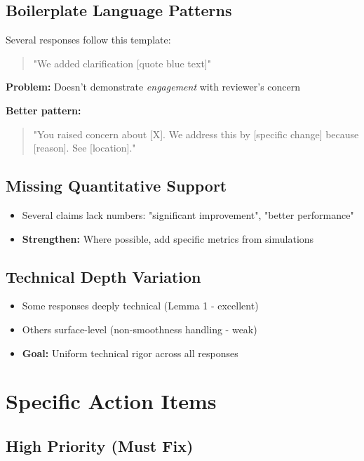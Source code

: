 \documentclass[11pt]{article}
\begin{document}
\subsection{Boilerplate Language Patterns}

Several responses follow this template:
\begin{quote}
"We added clarification [quote blue text]"
\end{quote}

\textbf{Problem:} Doesn't demonstrate \textit{engagement} with reviewer's concern

\textbf{Better pattern:}
\begin{quote}
"You raised concern about [X]. We address this by [specific change] because [reason]. See [location]."
\end{quote}

\subsection{Missing Quantitative Support}

\begin{itemize}
\item Several claims lack numbers: "significant improvement", "better performance"
\item \textbf{Strengthen:} Where possible, add specific metrics from simulations
\end{itemize}

\subsection{Technical Depth Variation}

\begin{itemize}
\item Some responses deeply technical (Lemma 1 - excellent)
\item Others surface-level (non-smoothness handling - weak)
\item \textbf{Goal:} Uniform technical rigor across all responses
\end{itemize}

\section{Specific Action Items}

\subsection{High Priority (Must Fix)}
\end{document}
